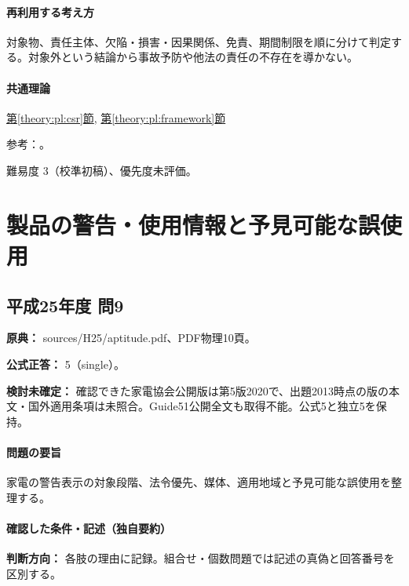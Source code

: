 \paragraph{再利用する考え方} 対象物、責任主体、欠陥・損害・因果関係、免責、期間制限を順に分けて判定する。対象外という結論から事故予防や他法の責任の不存在を導かない。

\paragraph{共通理論} \hyperref[theory:pl:csr]{第\ref*{theory:pl:csr}節}, \hyperref[theory:pl:framework]{第\ref*{theory:pl:framework}節}

\par 参考：\cite{pl_product_csr2016}。

\par 難易度 3（校準初稿）、優先度未評価。

\section{製品の警告・使用情報と予見可能な誤使用}

\subsection{平成25年度 問9}
\label{q:h25-reg-apt-09}

\noindent\textbf{原典：} sources/H25/aptitude.pdf、PDF物理10頁。

\textbf{公式正答：} 5（single）。

\par\textbf{検討未確定：} 確認できた家電協会公開版は第5版2020で、出題2013時点の版の本文・国外適用条項は未照合。Guide51公開全文も取得不能。公式5と独立5を保持。

\paragraph{問題の要旨} 家電の警告表示の対象段階、法令優先、媒体、適用地域と予見可能な誤使用を整理する。

\paragraph{確認した条件・記述（独自要約）}\mbox{}\par

\noindent\textbf{判断方向：} 各肢の理由に記録。組合せ・個数問題では記述の真偽と回答番号を区別する。\par


